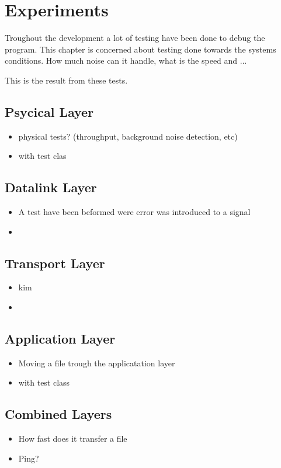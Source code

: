 \chapter{Experiments}\label{chap:experiments}
Troughout the development a lot of testing have been done to debug the program. This chapter is concerned about testing done towards the systems conditions. How much noise can it handle, what is the speed and ... 

This is the result from these tests.


\section{Psycical Layer}

\begin{itemize}
\item physical tests? (throughput, background noise detection, etc)
\item with test clas
\end{itemize}

\section{Datalink Layer}

\begin{itemize}
\item A test have been beformed were error was introduced to a signal
\item 
\end{itemize}

\section{Transport Layer}

\begin{itemize}
\item kim
\item 
\end{itemize}

\section{Application Layer}

\begin{itemize}
\item Moving a file trough the applicatation layer
\item with test class
\end{itemize}

\section{Combined Layers}

\begin{itemize}
\item How fast does it transfer a file
\item Ping?
\end{itemize}
